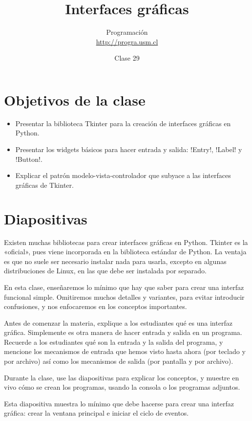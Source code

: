 \documentclass[10pt]{article}
\title{Interfaces gráficas}
\author{Programación \\ \url{http://progra.usm.cl}}
\date{Clase 29}
\begin{document}
  \maketitle

  \section*{Objetivos de la clase}
  \begin{itemize}
    \item Presentar la biblioteca Tkinter
      para la creación de interfaces gráficas en Python.
    \item Presentar los widgets básicos
      para hacer entrada y salida:
      \li!Entry!, \li!Label! y \li!Button!.
    \item Explicar el patrón modelo-vista-controlador
      que subyace a las interfaces gráficas de Tkinter.
  \end{itemize}

  \section*{Diapositivas}

  Existen muchas bibliotecas para crear interfaces gráficas en Python.
  Tkinter es la «oficial»,
  pues viene incorporada en la biblioteca estándar de Python.
  La ventaja es que no suele ser necesario instalar nada para usarla,
  excepto en algunas distribuciones de Linux, en las que debe ser instalada por separado.

  En esta clase,
  enseñaremos lo mínimo que hay que saber para crear una interfaz funcional simple.
  Omitiremos muchos detalles y variantes,
  para evitar introducir confusiones,
  y nos enfocaremos en los conceptos importantes.

  Antes de comenzar la materia,
  explique a los estudiantes qué es una interfaz gráfica.
  Simplemente es otra manera de hacer entrada y salida en un programa.
  Recuerde a los estudiantes qué son la entrada y la salida del programa,
  y mencione los mecanismos de entrada que hemos visto hasta ahora
  (por teclado y por archivo)
  así como los mecanismos de salida
  (por pantalla y por archivo).

  Durante la clase,
  use las diapositivas para explicar los conceptos,
  y muestre en vivo cómo se crean los programas,
  usando la consola o los programas adjuntos.


  Esta diapositiva muestra lo mínimo que debe hacerse
  para crear una interfaz gráfica:
  crear la ventana principal
  e iniciar el ciclo de eventos.
\end{document}

